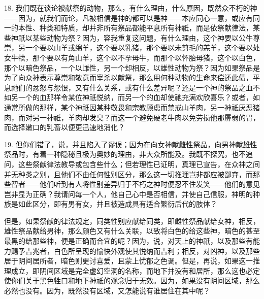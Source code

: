 18. 我们既在谈论被献祭的动物，那么，有什么理由，什么原因，既然众不朽的神——因为，就我们而论，凡被相信是神的都可以是神——本应同心一意，或应有同一的本性、种类和特质，却并非所有祭品都能平息所有神祇，而是依祭献律法，某些神祇以某些动物为祭？因为，容我重复这问题，有什么理由，这个神要以公牛尊崇，另一个要以山羊或绵羊，这个要以乳猪，那个要以未剪毛的羔羊，这个要以处女牛犊，那个要以有角山羊，这个以不孕母牛，而那个以怀胎母猪，这个以白色，那个以暗色祭品，一个以雌性，另一个却相反，以雄性动物为祭？因为如果祭品是为了向众神表示尊崇和敬意而宰杀以献祭，那么用何种动物的生命来偿还此债，平息祂们的忿怒与怨恨，又有什么关系，或有什么差异呢？还是一个神的祭品之血不如另一个的血那样令某位神祇悦纳，而另一个的血却使祂充满欢欣喜乐？或者，如通常所做的那样，某个神祇因某种敬畏和宗教顾虑而禁戒山羊肉，另一神祇厌恶猪肉，而对另一神祇，羊肉却发臭？而这一个避免硬老牛肉以免劳损他那孱弱的胃，而选择嫩口的乳畜以便更迅速地消化？\par

19. 但你们错了，说，并且陷入了谬误；因为在向女神献雌性祭品，向男神献雄性祭品时，有着一种隐秘且极为奥妙的理由，非大众所能及。我既不探究，也不追问，这些祭献律法教导或包含些什么；但若理性已证明，真理已宣告，在众神之间并无种类之别，且他们不由任何性别区分，那么这一切推理岂非都应被鄙弃，而那些智者——他们听到有人将性别差异归于不朽之神时便忍不住发笑——他们的意见岂非显为正确？我请问每一个人，他自己心中是否相信，并使自己信服，神明的种族是如此区分，即有男有女，并且被造成具有适合繁衍后代的肢体？\par

但是，如果祭献的律法规定，同类性别应献给同类，即雌性祭品献给女神，相反，雄性祭品献给男神，那么颜色又有什么关联，以致将白色的给这些神，暗色的甚至最黑的给那些神，便是正确而合宜的呢？因为，说，对天上的神祇，以及那些有能力赐予吉兆者，白色所呈现的愉快外观使其悦纳而吉利；相反，对凶神，以及那些居于阴间居所者，暗色则更讨喜爱，且蒙上忧郁之色调。但是，再说，如果这一推理成立，即阴间区域是完全虚幻空洞的名称，而地下并没有和居所，那么这也必定使你们关于黑色牲口和地下神祇的观念归于无效。因为，如果没有阴间区域，那么必然也没有。因为，既然没有区域，又怎能说有谁居住在其中呢？\par

